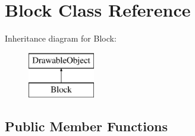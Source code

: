 \hypertarget{classBlock}{}\section{Block Class Reference}
\label{classBlock}
Inheritance diagram for Block\+:\begin{figure}[H]
\begin{center}
\leavevmode
\includegraphics[height=2.000000cm]{classBlock}
\end{center}
\end{figure}
\subsection*{Public Member Functions}
